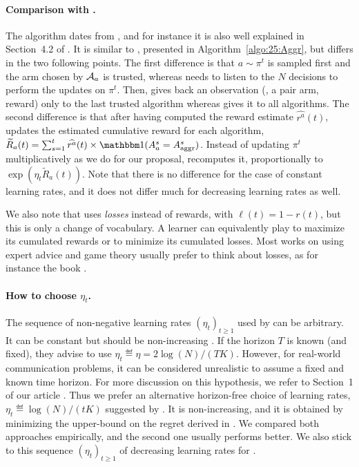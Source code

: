 \paragraph{Comparison with \ExpQ.}\label{sub:25:Exp4}
%
The \ExpQ{} algorithm dates from \cite{Auer02NonStochastic}, and for instance it is also well explained in Section~4.2 of \cite{Bubeck12}.
It is similar to \Aggr{}, presented in Algorithm~\ref{algo:25:Aggr},
but differs in the two following points.
%
The first difference is that $a\sim\pi^t$ is sampled first and the arm chosen by $\mathcal{A}_a$ is trusted, whereas \Aggr{}
needs to listen to the $N$ decisions to perform the updates on $\pi^{t}$.
Then, \ExpQ{} gives back an observation (\ie, a pair arm, reward) only to the last trusted algorithm
whereas \Aggr{} gives it to all algorithms.
%
The second difference is that after having computed the reward estimate $\widehat{r^a}(t)$, \ExpQ{} updates the estimated cumulative reward for each algorithm,
$\widetilde{R}_a(t) = \sum_{s=1}^{t} \widehat{r^a}(t) \times \indic(A^{s}_{a} = A^{s}_{\mathrm{aggr}})$.
%
Instead of updating $\pi^{t}$ multiplicatively as we do for our proposal, \ExpQ{} recomputes it, proportionally to
$\exp(\eta_t \widetilde{R}_a(t))$.
Note that there is no difference for the case of constant learning rates, and it does not differ much for decreasing learning rates as well.

We also note that \ExpQ{} uses \emph{losses} instead of rewards, with $\ell(t) = 1 - r(t)$, but this is only a change of vocabulary.
A learner can equivalently play to maximize its cumulated rewards or to minimize its cumulated losses.
Most works on using expert advice and game theory usually prefer to think about losses, as for instance the book \cite{CesaLugosi06}.


\paragraph{How to choose $\eta_t$.}
%
The sequence of non-negative learning rates $(\eta_t)_{t \geq 1}$ used by \ExpQ{} can be arbitrary.
It can be constant but should be non-increasing \cite[Theorem 4.2]{Bubeck12}.
If the horizon $T$ is known (and fixed), they advise to use $\eta_t \eqdef \eta = 2 \log(N) / (T K)$.
However, for real-world communication problems, it can be considered unrealistic to assume a fixed and known time horizon.
For more discussion on this hypothesis, we refer to Section~1 of our article \cite{Besson2018DoublingTricks}.
%
Thus we prefer an alternative horizon-free choice of learning rates,
$\eta_t \eqdef \log(N) / (t K)$ suggested by \cite{Bubeck12}.
It is non-increasing, and it is obtained by minimizing the upper-bound on the regret derived in \cite[pp48]{Bubeck12}.
%
We compared both approaches empirically, and the second one usually performs better.
We also stick to this sequence $(\eta_t)_{t \geq 1}$ of decreasing learning rates for \Aggr.



